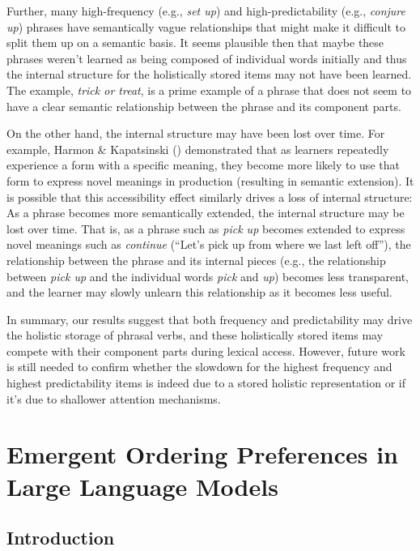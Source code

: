 \documentclass[
  12pt,
  letterpaper,
]{scrreprt}
\begin{document}
Further, many high-frequency (e.g., \emph{set up}) and
high-predictability (e.g., \emph{conjure up}) phrases have semantically
vague relationships that might make it difficult to split them up on a
semantic basis. It seems plausible then that maybe these phrases weren't
learned as being composed of individual words initially and thus the
internal structure for the holistically stored items may not have been
learned. The example, \emph{trick or treat}, is a prime example of a
phrase that does not seem to have a clear semantic relationship between
the phrase and its component parts.

On the other hand, the internal structure may have been lost over time.
For example, Harmon \& Kapatsinski
() demonstrated that as
learners repeatedly experience a form with a specific meaning, they
become more likely to use that form to express novel meanings in
production (resulting in semantic extension). It is possible that this
accessibility effect similarly drives a loss of internal structure: As a
phrase becomes more semantically extended, the internal structure may be
lost over time. That is, as a phrase such as \emph{pick up} becomes
extended to express novel meanings such as \emph{continue} (``Let's pick
up from where we last left off''), the relationship between the phrase
and its internal pieces (e.g., the relationship between \emph{pick up}
and the individual words \emph{pick} and \emph{up}) becomes less
transparent, and the learner may slowly unlearn this relationship as it
becomes less useful.

In summary, our results suggest that both frequency and predictability
may drive the holistic storage of phrasal verbs, and these holistically
stored items may compete with their component parts during lexical
access. However, future work is still needed to confirm whether the
slowdown for the highest frequency and highest predictability items is
indeed due to a stored holistic representation or if it's due to
shallower attention mechanisms.


\chapter{Emergent Ordering Preferences in Large Language
Models}\label{emergent-ordering-preferences-in-large-language-models}

\section{Introduction}\label{introduction-3}
\end{document}
